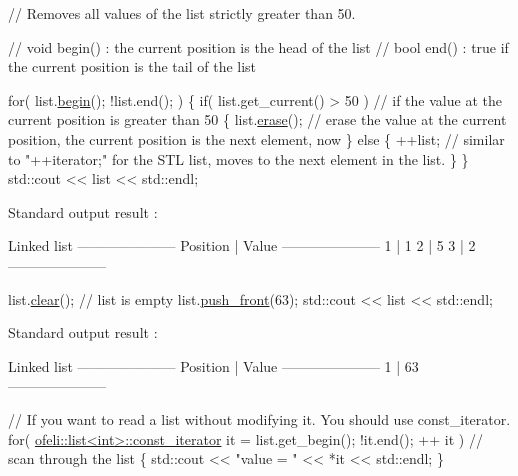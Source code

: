 \begin{DoxyCode}
\textcolor{comment}{// Removes all values of the list strictly greater than 50.}

\textcolor{comment}{// void begin() : the current position is the head of the list}
\textcolor{comment}{// bool end() : true if the current position is the tail of the list}

\textcolor{keywordflow}{for}( list.\hyperlink{classofeli_1_1list_a4f7f0567a64758636e3835ecea28a36f}{begin}(); !list.end(); )
\{
    \textcolor{keywordflow}{if}( list.get\_current() > 50 ) \textcolor{comment}{// if the value at the current position is greater than 50}
    \{
        list.\hyperlink{classofeli_1_1list_ae160d4ea7224becad437add3b1d594e4}{erase}(); \textcolor{comment}{// erase the value at the current position, the current position is the next
       element, now}
    \}
    \textcolor{keywordflow}{else}
    \{
        ++list; \textcolor{comment}{// similar to "++iterator;" for the STL list, moves to the next element in the list.}
    \}
\}
std::cout << list << std::endl;
\end{DoxyCode}
 
\begin{DoxyCode}
Standard output result :

     Linked list
---------------------
 Position | Value
---------------------
    1     |   1
    2     |   5
    3     |   2
---------------------
\end{DoxyCode}
 
\begin{DoxyCode}
list.\hyperlink{classofeli_1_1list_a1b4ab444619f6d412a461752ba019514}{clear}(); \textcolor{comment}{// list is empty}
list.\hyperlink{classofeli_1_1list_a87b7f6a90670e08d99e23f3377b001f9}{push\_front}(63);
std::cout << list << std::endl;
\end{DoxyCode}
 
\begin{DoxyCode}
Standard output result :

     Linked list
---------------------
 Position | Value
---------------------
    1     |   63
---------------------
\end{DoxyCode}
 
\begin{DoxyCode}
\textcolor{comment}{// If you want to read a list without modifying it. You should use const\_iterator.}
\textcolor{keywordflow}{for}( \hyperlink{classofeli_1_1list_1_1const__iterator}{ofeli::list<int>::const\_iterator} it = list.get\_begin(); !it.end(); ++
      it ) \textcolor{comment}{// scan through the list}
\{
    std::cout << \textcolor{stringliteral}{"value = "} << *it << std::endl;
\}
\end{DoxyCode}



\begin{DoxyCodeInclude}
\end{DoxyCodeInclude}
 